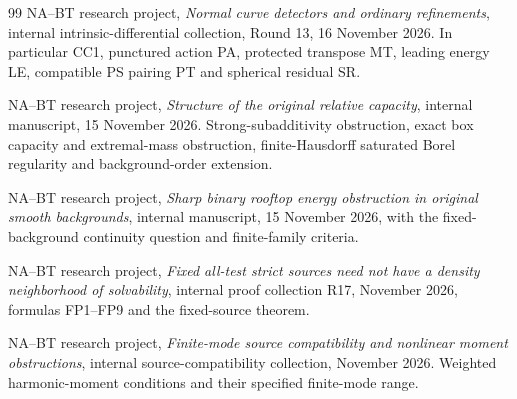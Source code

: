 \documentclass[11pt,a4paper]{article}
\theoremstyle{definition}
\theoremstyle{remark}
\numberwithin{equation}{section}
\begin{document}
\begin{thebibliography}{99}
NA--BT research project, \emph{Normal curve detectors and ordinary refinements},
internal intrinsic-differential collection, Round 13,
16 November 2026.  In particular CC1, punctured action PA, protected
transpose MT, leading energy LE, compatible PS pairing PT and
spherical residual SR.

NA--BT research project, \emph{Structure of the original relative capacity}, internal manuscript,
15 November 2026.  Strong-subadditivity obstruction, exact box
capacity and extremal-mass obstruction, finite-Hausdorff saturated
Borel regularity and background-order extension.

NA--BT research project, \emph{Sharp binary rooftop energy obstruction in original
smooth backgrounds}, internal manuscript, 15 November 2026, with
the fixed-background continuity question and finite-family criteria.

NA--BT research project, \emph{Fixed all-test strict sources need not have a density
neighborhood of solvability}, internal proof collection R17,
November 2026, formulas FP1--FP9 and the fixed-source theorem.

NA--BT research project, \emph{Finite-mode source compatibility and nonlinear
moment obstructions}, internal source-compatibility collection,
November 2026.  Weighted harmonic-moment conditions and their
specified finite-mode range.

\end{thebibliography}
\end{document}
